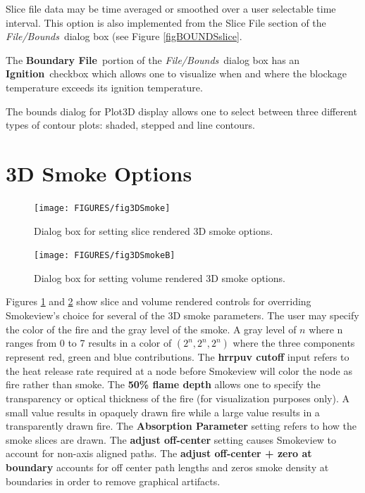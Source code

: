 \documentclass[11pt,twoside]{book}
\begin{document}
Slice file data may be time averaged or smoothed over a user
selectable time interval.  This option is also implemented from
the Slice File section of the {\em File/Bounds}\ dialog box (see
Figure \ref{figBOUNDSslice}.

The {\bf Boundary File}\ portion of the {\em File/Bounds}\ dialog
box has an {\bf Ignition}\ checkbox which allows one to visualize
when and where the blockage temperature exceeds its ignition
temperature.

The bounds dialog for Plot3D display allows one to select between
three different types of contour plots:  shaded, stepped and line
contours.
\section{3D Smoke Options}
\begin{figure}[\figoptions]
\centerline{\texttt{[image: FIGURES/fig3DSmoke]}
} \caption[Dialog Box for setting slice rendered 3D smoke options]
{Dialog box for setting slice rendered 3D smoke options.   }
\label{fig3DSmoke}
\end{figure}
\begin{figure}[\figoptions]
\centerline{\texttt{[image: FIGURES/fig3DSmokeB]}
} \caption[Dialog Box for setting volume rendered 3D smoke
options] {Dialog box for setting volume rendered 3D smoke options.
} \label{fig3DSmokeB}
\end{figure}
Figures \ref{fig3DSmoke} and \ref{fig3DSmokeB} show slice and
volume rendered controls for overriding Smokeview's choice for
several of the 3D smoke parameters.  The user may specify the
color of the fire and the gray level of the smoke.  A gray level
of $n$ where n ranges from 0 to 7 results in a color of
$(2^n,2^n,2^n)$ where the three components represent red, green
and blue contributions.  The {\bf hrrpuv cutoff} input refers to
the heat release rate required at a node before Smokeview will
color the node as fire rather than smoke. The {\bf 50\% flame
depth} allows one to specify the transparency or optical thickness
of the fire (for visualization purposes only). A small value
results in opaquely drawn fire while a large value results in a
transparently drawn fire. The {\bf Absorption Parameter} setting
refers to how the smoke slices are drawn.  The {\bf adjust
off-center} setting causes Smokeview to account for non-axis
aligned paths. The {\bf adjust off-center + zero at boundary}
accounts for off center path lengths and zeros smoke density at
boundaries in order to remove graphical artifacts.
\end{document}
